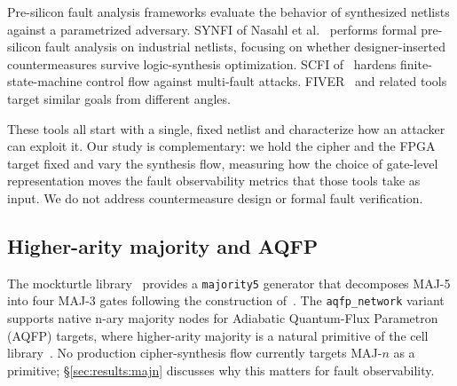 Pre-silicon fault analysis frameworks evaluate the behavior of
synthesized netlists against a parametrized adversary. SYNFI of
Nasahl et al.~\cite{nasahl2022synfi} performs formal pre-silicon
fault analysis on industrial netlists, focusing on whether
designer-inserted countermeasures survive logic-synthesis
optimization. SCFI of~\cite{nasahl2022scfi} hardens
finite-state-machine control flow against multi-fault attacks.
FIVER~\cite{richter2021fiver} and related tools target similar
goals from different angles.

These tools all start with a single, fixed netlist and characterize
how an attacker can exploit it. Our study is complementary: we hold
the cipher and the FPGA target fixed and vary the synthesis flow,
measuring how the choice of gate-level representation moves the
fault observability metrics that those tools take as input.
We do not address countermeasure design or formal fault verification.

\subsection{Higher-arity majority and AQFP}
\label{sec:background:majn}

The mockturtle library~\cite{soeken2018mockturtle} provides a
\texttt{majority5} generator that decomposes MAJ-5 into four MAJ-3
gates following the construction of~\cite{amaru2014mig}. The
\texttt{aqfp\_network} variant supports native n-ary majority nodes
for Adiabatic Quantum-Flux Parametron (AQFP) targets, where
higher-arity majority is a natural primitive of the cell
library~\cite{takeuchi2014aqfp}. No production
cipher-synthesis flow currently targets MAJ-$n$ as a primitive;
\S\ref{sec:results:majn} discusses why this matters for fault
observability.
